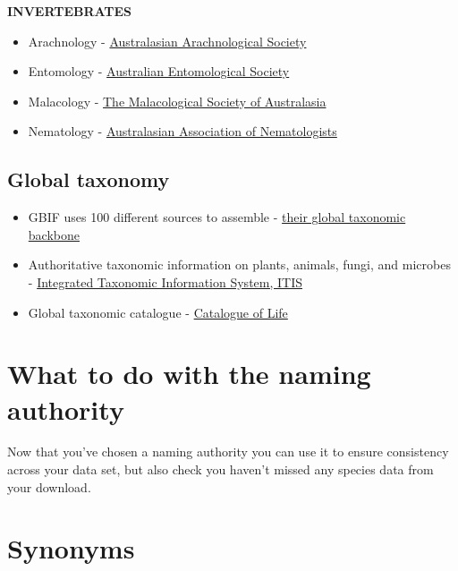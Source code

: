 \documentclass[
  letterpaper,
  DIV=11,
  numbers=noendperiod,
  oneside]{scrreprt}
\providecommand{\tightlist}{%
  \setlength{\itemsep}{0pt}\setlength{\parskip}{0pt}}\usepackage{longtable,booktabs,array}
\begin{document}
\textbf{INVERTEBRATES}

\begin{itemize}
\tightlist
\item
  Arachnology -
  \href{www.australasianarachnologicalsociety.org}{Australasian
  Arachnological Society}\\
\item
  Entomology - \href{https://www.austentsoc.org.au/}{Australian
  Entomological Society}\\
\item
  Malacology - \href{https://www.malsocaus.org/}{The Malacological
  Society of Australasia}\\
\item
  Nematology - \href{https://www.nematologists.org.au/}{Australasian
  Association of Nematologists}
\end{itemize}

\hypertarget{global-taxonomy}{%
\subsection{Global taxonomy}\label{global-taxonomy}}

\begin{itemize}
\item
  GBIF uses 100 different sources to assemble -
  \href{https://www.gbif.org/dataset/d7dddbf4-2cf0-4f39-9b2a-bb099caae36c}{their
  global taxonomic backbone}
\item
  Authoritative taxonomic information on plants, animals, fungi, and
  microbes - \href{https://www.itis.gov/}{Integrated Taxonomic
  Information System, ITIS}
\item
  Global taxonomic catalogue -
  \href{https://www.catalogueoflife.org/}{Catalogue of Life}
\end{itemize}

\hypertarget{what-to-do-with-the-naming-authority}{%
\section{What to do with the naming
authority}\label{what-to-do-with-the-naming-authority}}

Now that you've chosen a naming authority you can use it to ensure
consistency across your data set, but also check you haven't missed any
species data from your download.

\hypertarget{synonyms}{%
\section{Synonyms}\label{synonyms}}
\end{document}
